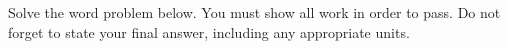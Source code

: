 
Solve the word problem below. You must show all work in order to pass. Do not forget to state your final answer, including any appropriate units.

\begin{statement}
\end{statement}

\begin{ansenv}
    \vspace{12pt}
\end{ansenv}

\trueemptypage